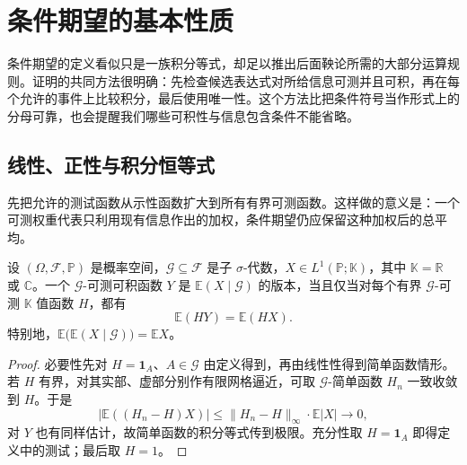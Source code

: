\section{条件期望的基本性质}
\label{b1:sec:3102}

条件期望的定义看似只是一族积分等式，却足以推出后面鞅论所需的大部分运算规则。证明的共同方法很明确：先检查候选表达式对所给信息可测并且可积，再在每个允许的事件上比较积分，最后使用唯一性。这个方法比把条件符号当作形式上的分母可靠，也会提醒我们哪些可积性与信息包含条件不能省略。

\subsection{线性、正性与积分恒等式}
\label{b1:subsec:310201}

先把允许的测试函数从示性函数扩大到所有有界可测函数。这样做的意义是：一个可测权重代表只利用现有信息作出的加权，条件期望仍应保留这种加权后的总平均。

\begin{proposition}[有界测试函数刻画]\label{b1:prop:conditional-expectation-tests-31}
设 \((\Omega,\mathcal F,\mathbb P)\) 是概率空间，\(\mathcal G\subseteq\mathcal F\) 是子 \(\sigma\)-代数，\(X\in L^1(\mathbb P;\mathbb K)\)，其中 \(\mathbb K=\mathbb R\) 或 \(\mathbb C\)。一个 \(\mathcal G\)-可测可积函数 \(Y\) 是 \(\mathbb E(X\mid\mathcal G)\) 的版本，当且仅当对每个有界 \(\mathcal G\)-可测 \(\mathbb K\) 值函数 \(H\)，都有
\begin{equation}\label{b1:eq:conditional-expectation-bounded-test-31}
 \mathbb E(HY)=\mathbb E(HX).
\end{equation}
特别地，\(\mathbb E\bigl(\mathbb E(X\mid\mathcal G)\bigr)=\mathbb E X\)。
\end{proposition}
\begin{proof}
必要性先对 \(H=\mathbf1_A\)、\(A\in\mathcal G\) 由定义得到，再由线性性得到简单函数情形。若 \(H\) 有界，对其实部、虚部分别作有限网格逼近，可取 \(\mathcal G\)-简单函数 \(H_n\) 一致收敛到 \(H\)。于是
\[
 \bigl|\mathbb E((H_n-H)X)\bigr|
 \leq\|H_n-H\|_\infty\cdot\mathbb E|X|\longrightarrow0,
\]
对 \(Y\) 也有同样估计，故简单函数的积分等式传到极限。充分性取 \(H=\mathbf1_A\) 即得定义中的测试；最后取 \(H=1\)。
\end{proof}

